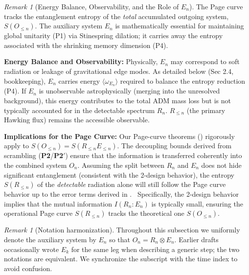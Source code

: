 \documentclass[11pt,a4paper]{article}
\newcommand{\Ptwo}{\textbf{P2}\xspace}
\newcommand{\PtwoPrime}{\textbf{P2$'$}\xspace}
\theoremstyle{plain}
\theoremstyle{definition}
\theoremstyle{remark}
\newtheorem{remark}[theorem]{Remark}
\begin{document}
\begin{remark}[Energy Balance, Observability, and the Role of $E_n$]\label{rem:entropy_target_E_n}
The Page curve tracks the entanglement entropy of the \emph{total} accumulated outgoing system, $S(O_{\le n})$. The auxiliary system $E_n$ is mathematically essential for maintaining global unitarity (P1) via Stinespring dilation; it carries away the entropy associated with the shrinking memory dimension (P4).

\textbf{Energy Balance and Observability:} Physically, $E_n$ may correspond to soft radiation or leakage of gravitational edge modes. As detailed below (Sec 2.4, bookkeeping), $E_n$ carries energy $\langle \omega_{E_{n}}\rangle$ required to balance the entropy reduction (P4). If $E_n$ is unobservable astrophysically (merging into the unresolved background), this energy contributes to the total ADM mass loss but is not typically accounted for in the detectable spectrum $R_n$. $R_{\le n}$ (the primary Hawking flux) remains the accessible observable.

\textbf{Implications for the Page Curve:} Our Page-curve theorems () rigorously apply to $S(O_{\le n})=S(R_{\le n}E_{\le n})$. The decoupling bounds derived from scrambling (\Ptwo/\PtwoPrime) ensure that the information is transferred coherently into the combined system $O_n$. Assuming the split between $R_n$ and $E_n$ does not hide significant entanglement (consistent with the 2-design behavior), the entropy $S(R_{\le n})$ of the \emph{detectable} radiation alone will still follow the Page curve behavior up to the error terms derived in .
\ Specifically, the 2-design behavior implies that the mutual information $I(R_n:E_n)$ is typically small, ensuring the operational Page curve $S(R_{\le n})$ tracks the theoretical one $S(O_{\le n})$.
\end{remark}

\begin{remark}[Notation harmonization]
Throughout this subsection we uniformly denote the auxiliary system by $E_n$ so that
$O_n=R_n\otimes E_n$.
Earlier drafts occasionally wrote $E_k$ for the same leg when describing a generic step;
the two notations are equivalent. We synchronize the subscript with the time index to
avoid confusion.
\end{remark}
\end{document}
